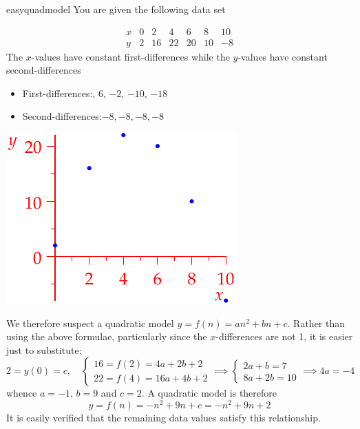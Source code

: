 \begin{example}{}{easyquadmodel}
	You are given the following data set\par
	\begin{minipage}[t]{0.65\linewidth}\vspace{-10pt}
		\[
			\begin{array}{c|cccccc}
				x&0&2&4&6&8&10\\\hline
				y&2&16&22&20&10&-8
			\end{array}
		\]
		The $x$-values have constant first-differences while the $y$-values have constant second-differences
		\begin{itemize}
		  \item[]First-differences:, 6, $-2$, $-10$, $-18$
		  \item[]Second-differences:\lstsp $-8,-8,-8,-8$
		\end{itemize}
\end{minipage}
\hfill
\begin{minipage}[t]{0.34\linewidth}\vspace{-10pt}
	\flushright\includegraphics{seqquadex2}
\end{minipage}
\bigbreak

We therefore suspect a quadratic model $y=f(n)=an^2+bn+c$. Rather than using the above formulae, particularly since the $x$-differences are not 1, it is easier just to substitute:
\[
	2=y(0)=c,\quad
	\begin{cases}
		16=f(2)=4a+2b+2\\
		22=f(4)=16a+4b+2
	\end{cases}
	\implies
	\begin{cases}
		2a+b=7\\
		8a+2b=10
	\end{cases}
	\implies 4a=-4
\]
whence $a=-1$, $b=9$ and $c=2$. A quadratic model is therefore
\[
	y=f(n)=-n^2+9n+c= -n^2+9n+2
\]
It is easily verified that the remaining data values satisfy this relationship.
\end{example}

